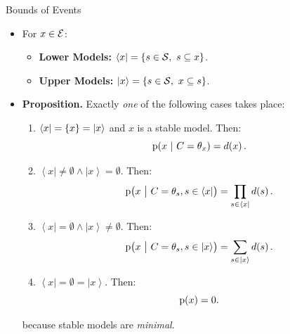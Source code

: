 \documentclass{beamer}
\newcommand{\at}[1]{\ensuremath{\!\del{#1}}}
\newcommand{\fml}[1]{\ensuremath{{\cal #1}}}
\newcommand{\cset}[2]{\ensuremath{\set{#1,~#2}}}
\newcommand{\uset}[1]{\ensuremath{\left|{#1}\right>}}
\newcommand{\lset}[1]{\ensuremath{\left<{#1}\right|}}
\newcommand{\pr}[1]{\ensuremath{\mathrm{p}\at{#1}}}
\newcommand{\given}{\ensuremath{~\middle|~}}
\begin{document}
\begin{frame}{Bounds of Events}    
    \begin{itemize}
        \item For $x\in\fml{E}$:
        \begin{itemize}
            \item \textbf{Lower Models:} $\lset{x} = \cset{s\in \fml{S} }{ s \subseteq x}$.
            \item \textbf{Upper Models:} $\uset{x} = \cset{s\in \fml{S} }{ x \subseteq s}$.
        \end{itemize}
        \item\label{prop:lucases} \textbf{Proposition.} Exactly \textit{one} of the following cases takes place: 
        \begin{enumerate}
            \item\label{prop:lucases.a} $\lset{x} = \set{x} = \uset{x}$ and $x$ is a stable model. Then:
            \begin{equation}
                \pr{x \given C = \theta_x} = d\at{x}.
            \end{equation}
            \item\label{prop:lucases.b} $\lset{x} \neq \emptyset \land \uset{x} = \emptyset$.  Then:
            \begin{equation}
                \pr{x \given C = \theta_s, s \in \lset{x}} = \prod_{s\in\lset{x}} d\at{s}.
            \end{equation}
            \item\label{prop:lucases.c} $\lset{x} = \emptyset \land \uset{x} \neq \emptyset$. Then:
            \begin{equation}
                \pr{x \given  C = \theta_s, s \in \uset{x}} = \sum_{s\in\uset{x}} d\at{s}.
            \end{equation}
            \item\label{prop:lucases.d} $\lset{x} = \emptyset = \uset{x}$.  Then:
            \begin{equation}
                \pr{x} = 0.
            \end{equation}
        \end{enumerate}
        because stable models are \textit{minimal}.
    \end{itemize}
\end{frame}
\end{document}
